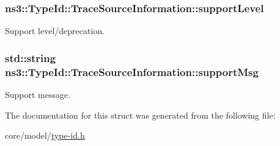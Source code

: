 \subsubsection[{\texorpdfstring{support\+Level}{supportLevel}}]{ ns3\+::\+Type\+Id\+::\+Trace\+Source\+Information\+::support\+Level}\hypertarget{structns3_1_1TypeId_1_1TraceSourceInformation_ae798a80cfd0ea174ae9483b01623f4c0}{}\label{structns3_1_1TypeId_1_1TraceSourceInformation_ae798a80cfd0ea174ae9483b01623f4c0}
Support level/deprecation. 
\subsubsection[{\texorpdfstring{support\+Msg}{supportMsg}}]{\setlength{\rightskip}{0pt plus 5cm}std\+::string ns3\+::\+Type\+Id\+::\+Trace\+Source\+Information\+::support\+Msg}\hypertarget{structns3_1_1TypeId_1_1TraceSourceInformation_a5934caf8d6adea8d3ff8c1df15aa6837}{}\label{structns3_1_1TypeId_1_1TraceSourceInformation_a5934caf8d6adea8d3ff8c1df15aa6837}
Support message. 

The documentation for this struct was generated from the following file\+:\begin{DoxyCompactItemize}
\item 
core/model/\hyperlink{type-id_8h}{type-\/id.\+h}\end{DoxyCompactItemize}
